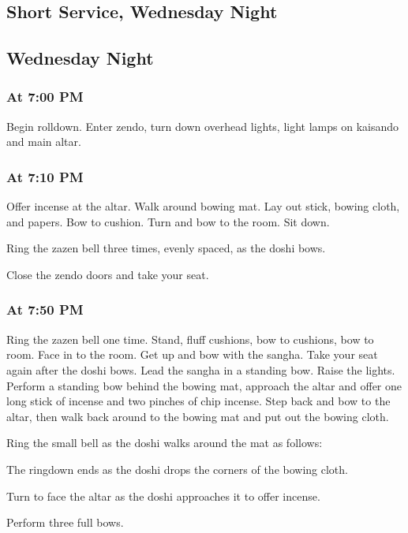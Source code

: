 \documentclass{chantbook}
\begin{document}
\begin{services}
\part{Short Service, Wednesday Night}
\chapter{Wednesday Night}
\section*{At 7:00 PM}
\tenken Begin rolldown.
\doan Enter zendo, turn down overhead lights, light lamps on kaisando and main
altar.
\section*{At 7:10 PM}

\doshi Offer incense at the altar. Walk around bowing mat. Lay out stick,
bowing cloth, and papers. Bow to cushion. Turn and bow to the room. Sit down.

\doan Ring the zazen bell three times, evenly spaced, as the doshi bows.
\jundoStartZazen

\tenken Close the zendo doors and take your seat.

\section*{At 7:50 PM}
\doan Ring the zazen bell one time. \bigspace\zazenbell
\sangha Stand, fluff cushions, bow to cushions, bow to room. Face in to the
room.
\doan Get up and bow with the sangha. Take your seat again after the doshi
bows.
\doshi Lead the sangha in a standing bow.
\tenken Raise the lights.
\doshi Perform a standing bow behind the bowing mat, approach the altar and
offer one long stick of incense and two pinches of chip incense. Step back and
bow to the altar, then walk back around to the bowing mat and put out the
bowing cloth.

\pagebreak

\doan Ring the small bell as the doshi walks around the mat as follows:

\doshiBowingClothRolldown

The ringdown ends as the doshi drops the corners of the bowing cloth.

\kokyo Turn to face the altar as the doshi approaches it to offer incense.

\doshi Perform three full bows.


\end{services}
\end{document}
